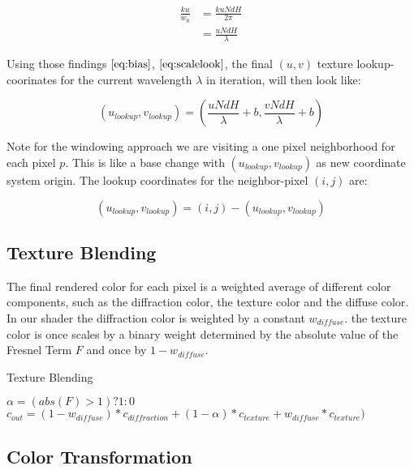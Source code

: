 \begin{align}
    \frac{ku}{w_0} 
    &= \frac{ku N dH}{2 \pi} \\
    &= \frac{u N dH}{\lambda}
\label{eq:scalelook}
\end{align}

Using those findings $\ref{eq:bias}$, $\ref{eq:scalelook}$, the final $(u,v)$ texture lookup-coorinates for the current wavelength $\lambda$ in iteration, will then look like:

\begin{equation}
  (u_{lookup}, v_{lookup}) = \left( \frac{u N dH}{\lambda} + b, \frac{v N dH}{\lambda} + b \right)
\label{eq:ublookup}
\end{equation}  

Note for the windowing approach we are visiting a one pixel neighborhood for each pixel $p$. 
This is like a base change with $(u_{lookup}, v_{lookup})$ as new coordinate system origin. The lookup coordinates for the neighbor-pixel $(i,j)$ are:

\begin{equation}
  (u_{lookup}, v_{lookup}) = (i,j)-(u_{lookup}, v_{lookup})
\label{eq:gaussianwindowlook}
\end{equation}

\subsection{Texture Blending}
The final rendered color for each pixel is a weighted average of different color components, such as the diffraction color, the texture color and the diffuse color. In our shader the diffraction color is weighted by a constant $w_{diffuse}$. the texture color is once scales by a binary weight determined by the absolute value of the Fresnel Term $F$ and once by $1-w_{diffuse}$. 

\begin{algorithm}[H]
  \caption{Texture Blending}
  \begin{algorithmic}
    \State $\alpha = (abs(F) > 1) ? 1 : 0$
    \State $c_{out} =(1-w_{diffuse})*c_{diffraction} + (1-\alpha)*c_{texture} + w_{diffuse}*c_{texture})$
  \end{algorithmic}
\end{algorithm}

\subsection{Color Transformation}
\label{subsec:colortransformations}

